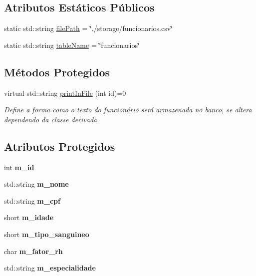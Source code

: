 \subsection*{Atributos Estáticos Públicos}
\begin{DoxyCompactItemize}
\item 
static std\+::string \hyperlink{classFuncionario_a15c3f1c0a9cefad48a036666c2352b60}{file\+Path} = \char`\"{}./storage/funcionarios.\+csv\char`\"{}
\item 
static std\+::string \hyperlink{classFuncionario_a6c10ac916f8b0435bea51c240ca0df34}{table\+Name} = \char`\"{}funcionarios\char`\"{}
\end{DoxyCompactItemize}
\subsection*{Métodos Protegidos}
\begin{DoxyCompactItemize}
\item 
virtual std\+::string \hyperlink{classFuncionario_a696332cf5ccde3a31f84e5af687e7ec2}{print\+In\+File} (int id)=0
\begin{DoxyCompactList}\small\item\em Define a forma como o texto do funcionário será armazenada no banco, se altera dependendo da classe derivada. \end{DoxyCompactList}\end{DoxyCompactItemize}
\subsection*{Atributos Protegidos}
\begin{DoxyCompactItemize}
\item 
\mbox{\label{classFuncionario_a123c4af00e4e6eea5d4d9366a8bfefed}} 
int {\bfseries m\+\_\+id}
\item 
\mbox{\label{classFuncionario_a6d5228656aa32b0f36f02e08c51cd1e4}} 
std\+::string {\bfseries m\+\_\+nome}
\item 
\mbox{\label{classFuncionario_a74bd5f4c71bfb42219f0cce2a72eeb47}} 
std\+::string {\bfseries m\+\_\+cpf}
\item 
\mbox{\label{classFuncionario_a2bc5a68aebcf1a792812430ce5c8bdca}} 
short {\bfseries m\+\_\+idade}
\item 
\mbox{\label{classFuncionario_aecf4c525d6ac81601db0e7a034c82321}} 
short {\bfseries m\+\_\+tipo\+\_\+sanguineo}
\item 
\mbox{\label{classFuncionario_ab8b1fa2c4d830ea6a03c5d1db8ee1002}} 
char {\bfseries m\+\_\+fator\+\_\+rh}
\item 
\mbox{\label{classFuncionario_ac9ccf61efca75f4130e79ef06b7278a2}} 
std\+::string {\bfseries m\+\_\+especialidade}
\end{DoxyCompactItemize}


